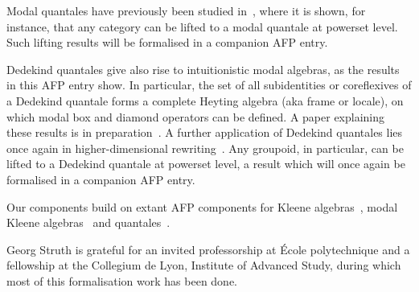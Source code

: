 \documentclass[11pt,a4paper]{article}
\begin{document}
  Modal quantales have previously been studied
  in~\cite{FahrenbergJSZ23}, where it is shown, for instance, that any
  category can be lifted to a modal quantale at powerset level. Such
  lifting results will be formalised in a companion AFP entry.

  Dedekind quantales give also rise to intuitionistic modal algebras,
  as the results in this AFP entry show. In particular, the set of all
  subidentities or coreflexives of a Dedekind quantale forms a
  complete Heyting algebra (aka frame or locale), on which modal box
  and diamond operators can be defined. A paper explaining these
  results is in preparation~\cite{PousS23}. A further application of
  Dedekind quantales lies once again in higher-dimensional
  rewriting~\cite{CalkGMS22,CalkMPS23}. Any groupoid, in particular,
  can be lifted to a Dedekind quantale at powerset level, a result
  which will once again be formalised in a companion AFP entry.

  Our components build on extant AFP components for Kleene
  algebras~\cite{ArmstrongSW13}, modal Kleene
  algebras~\cite{GomesGHSW16} and quantales~\cite{Struth18}.

  \vspace{\baselineskip}

  Georg Struth is grateful for an invited professorship at École
  polytechnique and a fellowship at the Collegium de Lyon, Institute
  of Advanced Study, during which most of this formalisation work
  has been done.





\end{document}
